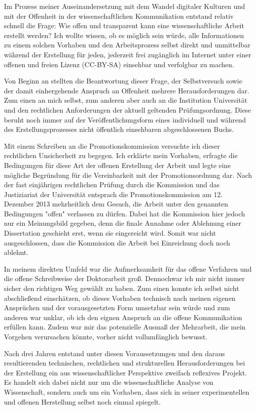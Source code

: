 Im Prozess meiner Auseinandersetzung mit dem Wandel digitaler Kulturen und mit der Offenheit in der wissenschaftlichen Kommunikation entstand relativ schnell die Frage: Wie offen und transparent kann eine wissenschaftliche Arbeit erstellt werden? Ich wollte wissen, ob es möglich sein würde, alle Informationen zu einem solchen Vorhaben und den Arbeitsprozess selbst direkt und unmittelbar während der Erstellung für jeden, jederzeit frei zugänglich im Internet unter einer offenen und freien Lizenz (CC-BY-SA) einsehbar und verfolgbar zu machen.

Von Beginn an stellten die Beantwortung dieser Frage, der Selbstversuch sowie der damit einhergehende Anspruch an Offenheit mehrere Herausforderungen dar. Zum einen an mich selbst, zum anderen aber auch an die Institution Universität und den rechtlichen Anforderungen der aktuell geltenden Prüfungsordnung. Diese beruht noch immer auf der Veröffentlichungsform eines individuell und während des Erstellungsprozesses nicht öffentlich einsehbaren abgeschlossenen Buchs.

Mit einem Schreiben an die Promotionskommission versuchte ich dieser rechtlichen Unsicherheit zu begegen. Ich erklärte mein Vorhaben, erfragte die Bedingungen für diese Art der offenen Erstellung der Arbeit und legte eine mögliche Begründung für die Vereinbarkeit mit der Promotionsordnung dar. Nach der fast einjährigen rechtlichen Prüfung durch die Kommission und das Justiziariat der Universität entsprach die Promotionskommission am 12. Dezember 2013 mehrheitlich dem Gesuch, die Arbeit unter den genannten Bedingungen "offen" verfassen zu dürfen. Dabei hat die Kommission hier jedoch nur ein Meinungsbild gegeben, denn die finale Annahme oder Ablehnung einer Dissertation geschieht erst, wenn sie eingereicht wird. Somit war nicht ausgeschlossen, dass die Kommission die Arbeit bei Einreichung doch noch ablehnt.

In meinem direkten Umfeld war die Aufmerksamkeit für das offene Verfahren und die offene Schreibweise der Doktorarbeit groß.  Dennochwar ich mir nicht immer sicher den richtigen Weg gewählt zu haben. Zum einen konnte ich selbst nicht abschließend einschätzen, ob dieses Vorhaben technisch nach meinen eigenen Ansprüchen und der vorausgesetzten Form umsetzbar sein würde und zum anderen war unklar, ob ich den eignen Anspruch an die offene Kommunikation erfüllen kann. Zudem war mir das potenzielle Ausmaß der Mehrarbeit, die mein Vorgehen verursachen könnte, vorher nicht vollumfänglich bewusst.

Nach drei Jahren entstand unter diesen Voraussetzungen und den daraus resultierenden technischen, rechtlichen und strukturellen Herausforderungen bei der Erstellung ein aus wissenschaftlicher Perspektive zweifach reflexives Projekt. Es handelt sich dabei nicht nur um die wissenschaftliche Analyse von Wissenschaft, sondern auch um ein Vorhaben, dass sich in seiner experimentellen und offenen Herstellung selbst noch einmal spiegelt.


